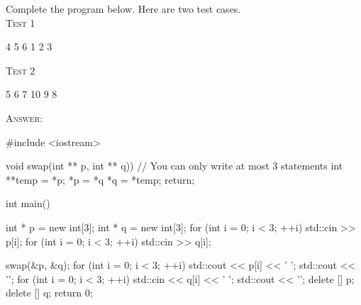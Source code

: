 \newpage
\nextq
Complete the program below. Here are two test cases.
\\
\textsc{Test 1}
\begin{console}[commandchars=\\\{\}]
4 5 6
1 2 3
\end{console}
\textsc{Test 2}
\begin{console}[commandchars=\\\{\}]
5 6 7
10 9 8
\end{console}

\textsc{Answer:}\vspace{-2mm}
\begin{answercode}
#include <iostream>

void swap(int ** p, int ** q))
{
    // You can only write at most 3 statements
    int **temp = *p;
    *p = *q
    *q = *temp;
    return;
}

int main()
{
    int * p = new int[3];
    int * q = new int[3];
    for (int i = 0; i < 3; ++i)
    {
        std::cin >> p[i];
    }
    for (int i = 0; i < 3; ++i)
    {
        std::cin >> q[i];
    }

    swap(&p, &q);
    for (int i = 0; i < 3; ++i)
    {
        std::cout << p[i] << ' ';
    }
    std::cout << '\n';
    for (int i = 0; i < 3; ++i)
    {
        std::cin << q[i] << ' ';
    }
    std::cout << '\n';
    delete [] p;
    delete [] q;
    return 0;
}
\end{answercode}

\newpage


